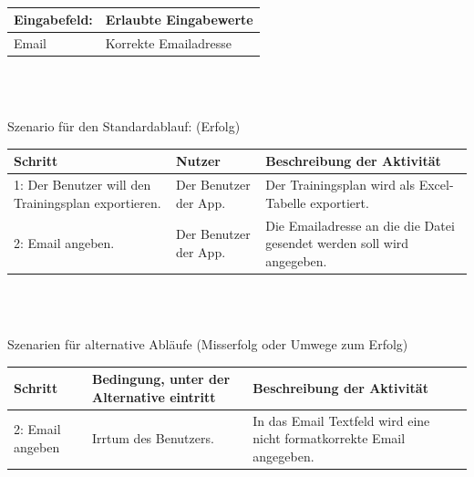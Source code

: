\documentclass[FIPLY_base.tex]{subfiles}
\begin{document}
		\ \\
	\begin{center}
		\def\arraystretch{1.3}%
		\begin{tabular}{| p{5cm} | p{5cm} |}
			\hline
			\textbf{Eingabefeld:} & \textbf{Erlaubte Eingabewerte} \\ \hline 
			Email & Korrekte Emailadresse \\ \hline
		\end{tabular} \\
	\end{center}
	\ \\
	Szenario für den Standardablauf: (Erfolg)
	\begin{center}	
		\def\arraystretch{1.3}%
		\begin{tabular}{| p{3cm} | p{3cm} | p{6cm} |}
			\hline
			\textbf{Schritt} & \textbf{Nutzer} & \textbf{Beschreibung der Aktivität}  \\ \hline 
			1: Der Benutzer will den Trainingsplan exportieren. & Der Benutzer der App. & Der Trainingsplan wird als Excel-Tabelle exportiert.\\ \hline
			2: Email angeben. & Der Benutzer der App. & Die Emailadresse an die die Datei gesendet werden soll wird angegeben.  \\ \hline
		\end{tabular} \\
	\end{center}
	\ \\
	Szenarien für alternative Abläufe (Misserfolg oder Umwege zum Erfolg)
	\begin{center}
		\def\arraystretch{1.3}%
		\begin{tabular}{| p{3cm} | p{3cm} | p{6cm} |}
			\hline
			\textbf{Schritt} & \textbf{Bedingung, unter der Alternative eintritt} & \textbf{Beschreibung der Aktivität}  \\ \hline 
			2: Email angeben & Irrtum des Benutzers. & In das Email Textfeld wird eine nicht formatkorrekte Email angegeben.\\ \hline
		\end{tabular} \\
	\end{center}
	\ \\
\end{document}
